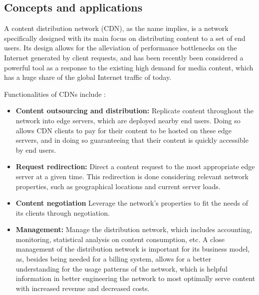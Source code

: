\subsection{Concepts and applications}

    A content distribution network (CDN), as the name implies, is a network specifically designed with its main focus on distributing content to a set of end users.
    Its design allows for the alleviation of performance bottlenecks on the Internet generated by client requests, and has been recently been considered a powerful tool as a response to the existing high demand for media content, which has a huge share of the global Internet traffic of today.

    Functionalities of CDNs include \cite{cdn-survey}:

    \begin{itemize}
        \item \textbf{Content outsourcing and distribution:} Replicate content throughout the network into edge servers, which are deployed nearby end users.
            Doing so allows CDN clients to pay for their content to be hosted on these edge servers, and in doing so guaranteeing that their content is quickly accessible by end users.
        \item \textbf{Request redirection:} Direct a content request to the most appropriate edge server at a given time.
            This redirection is done considering relevant network properties, such as geographical locations and current server loads.
        \item \textbf{Content negotiation} Leverage the network's properties to fit the needs of its clients through negotiation.
        \item \textbf{Management:} Manage the distribution network, which includes accounting, monitoring, statistical analysis on content consumption, etc.
            A close management of the distribution network is important for its business model, as, besides being needed for a billing system, allows for a better understanding for the usage patterns of the network, which is helpful information in better engineering the network to most optimally serve content with increased revenue and decreased costs.
    \end{itemize}

